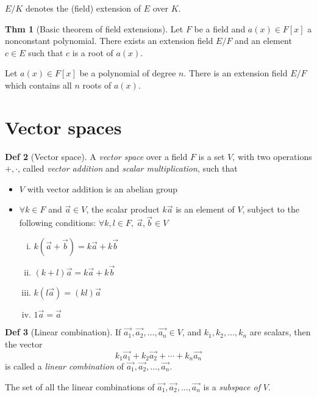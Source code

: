 \documentclass{article}
\theoremstyle{definition}
\newtheorem{definition}{Def}[section]
\newtheorem{theorem}[definition]{Thm}
\begin{document}
$E/K$ denotes the (field) extension of $E$ over $K$.

\begin{theorem}[Basic theorem of field extensions]
    Let $F$ be a field and $a(x) \in F[x]$ a nonconstant polynomial. There exists an extension field $E/F$ and an element $c \in E$ such that $c$ is a root of $a(x)$.
\end{theorem}

Let $a(x) \in F[x]$ be a polynomial of degree $n$. There is an extension field $E/F$ which contains all $n$ roots of $a(x)$.

\section{Vector spaces}

\begin{definition}[Vector space]
    A \emph{vector space} over a field $F$ is a set $V$, with two operations $+, \cdot$, called \emph{vector addition} and \emph{scalar multiplication}, such that

    \begin{itemize}
	\item $V$ with vector addition is an abelian group
	\item $\forall k \in F$ and $\overrightarrow{a} \in V$, the scalar product $k \overrightarrow{a}$ is an element of $V$, subject to the following conditions:
	    $\forall k, l \in F,~\overrightarrow{a},\overrightarrow{b} \in V$
	    \begin{enumerate}[i.]
		\item $k(\overrightarrow{a} + \overrightarrow{b}) = k\overrightarrow{a} + k\overrightarrow{b}$
		\item $(k + l)\overrightarrow{a} = k\overrightarrow{a} + k\overrightarrow{b}$
		\item $k(l\overrightarrow{a}) = (kl)\overrightarrow{a}$
		\item $1 \overrightarrow{a} = \overrightarrow{a}$
	    \end{enumerate}
    \end{itemize}
\end{definition}

\begin{definition}[Linear combination]
    If $\overrightarrow{a_1}, \overrightarrow{a_2}, \ldots, \overrightarrow{a_n} \in V$, and $k_1, k_2, \ldots, k_n$ are scalars, then the vector
    $$k_1 \overrightarrow{a_1} + k_2 \overrightarrow{a_2} + \cdots + k_n \overrightarrow{a_n}$$
    is called a \emph{linear combination} of $\overrightarrow{a_1}, \overrightarrow{a_2}, \ldots, \overrightarrow{a_n}$.

    The set of all the linear combinations of $\overrightarrow{a_1}, \overrightarrow{a_2}, \ldots, \overrightarrow{a_n}$ is a \emph{subspace of} $V$.
\end{definition}
\end{document}
